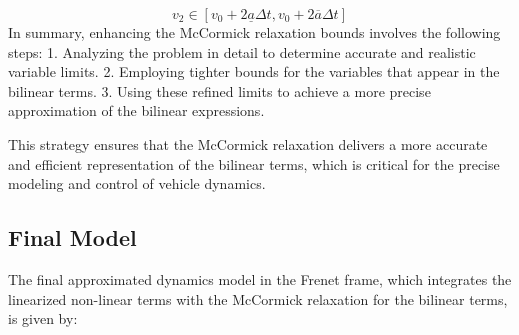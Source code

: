 \[ v_2 \in [v_0 + 2\underline{a} \Delta t, v_0 +
		2\overline{a} \Delta t] \]
In summary, enhancing the McCormick relaxation bounds involves the following steps:
1.
Analyzing the problem in detail to determine accurate and realistic variable limits.
2.
Employing tighter bounds for the variables that appear in the bilinear terms.
3.
Using these refined limits to achieve a more precise approximation of the bilinear expressions.

This strategy ensures that the McCormick relaxation delivers a more accurate and efficient representation of the bilinear terms, which is critical
for the precise modeling and control of vehicle dynamics.

\subsection{Final Model} \label{subsec:bicycle_resulting_model}

The final approximated dynamics model in the Frenet frame, which integrates the linearized non-linear terms with the McCormick relaxation for the bilinear terms, is given by:

